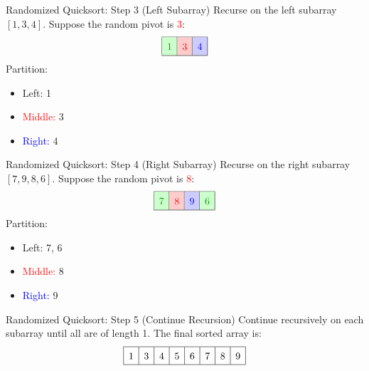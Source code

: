 \documentclass[aspectratio=169]{beamer}
\begin{document}
\begin{frame}{Randomized Quicksort: Step 3 (Left Subarray)}
  Recurse on the left subarray $[1, 3, 4]$.
  \pause
  Suppose the random pivot is \textcolor{red}{3}:
  \[
    \renewcommand{\arraystretch}{1.5}
    \begin{array}{|c|c|c|}
      \hline
      \cellcolor{green!20}\textcolor{green!60!black}{1} & \cellcolor{red!20}\textcolor{red}{3} & \cellcolor{blue!20}\textcolor{blue}{4} \\
      \hline
    \end{array}
  \]
  \pause
  Partition:
  \begin{itemize}
    \item \textcolor{green!60!black}{Left:} 1
    \item \textcolor{red}{Middle:} 3
    \item \textcolor{blue}{Right:} 4
  \end{itemize}
\end{frame}

\begin{frame}{Randomized Quicksort: Step 4 (Right Subarray)}
  Recurse on the right subarray $[7, 9, 8, 6]$.
  \pause
  Suppose the random pivot is \textcolor{red}{8}:
  \[
    \renewcommand{\arraystretch}{1.5}
    \begin{array}{|c|c|c|c|}
      \hline
      \cellcolor{green!20}\textcolor{green!60!black}{7} & \cellcolor{red!20}\textcolor{red}{8} & \cellcolor{blue!20}\textcolor{blue}{9} & \cellcolor{green!20}\textcolor{green!60!black}{6} \\
      \hline
    \end{array}
  \]
  \pause
  Partition:
  \begin{itemize}
    \item \textcolor{green!60!black}{Left:} 7, 6
    \item \textcolor{red}{Middle:} 8
    \item \textcolor{blue}{Right:} 9
  \end{itemize}
\end{frame}

\begin{frame}{Randomized Quicksort: Step 5 (Continue Recursion)}
  Continue recursively on each subarray until all are of length 1.
  \pause
  The final sorted array is:
  \[
    \renewcommand{\arraystretch}{1.5}
    \begin{array}{|c|c|c|c|c|c|c|c|}
      \hline
      1 & 3 & 4 & 5 & 6 & 7 & 8 & 9 \\
      \hline
    \end{array}
  \]
\end{frame}
\end{document}
